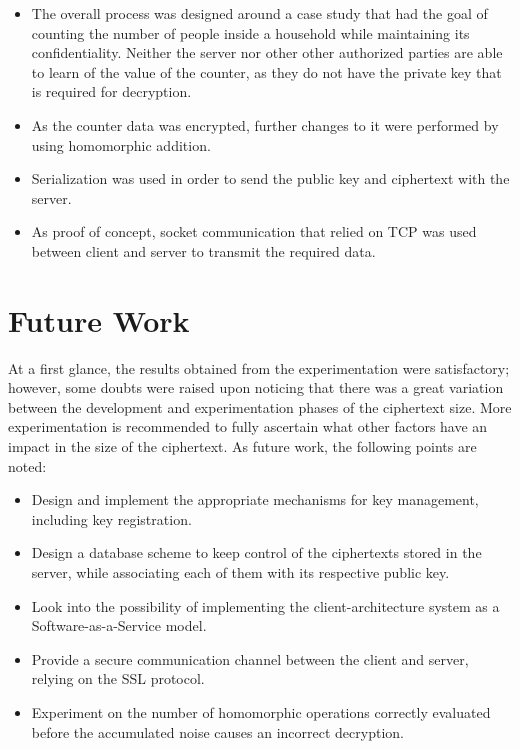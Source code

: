 \begin{itemize}
\item The overall process was designed around a case study that had the goal of counting the number of people inside a household while maintaining its confidentiality. Neither the server nor other other authorized parties are able to learn of the value of the counter, as they do not have the private key that is required for decryption.
\item As the counter data was encrypted, further changes to it were performed by using homomorphic addition. 
\item Serialization was used in order to send the public key and ciphertext with the server.
\item As proof of concept, socket communication that relied on TCP was used between client and server to transmit the required data.
\end{itemize} 

\section{Future Work}
At a first glance, the results obtained from the experimentation were satisfactory; however, some doubts were raised upon noticing that there was a great variation between the development and experimentation phases of the ciphertext size. More experimentation is recommended to fully ascertain what other factors have an impact in the size of the ciphertext. As future work, the following points are noted:

\begin{itemize}
\item Design and implement the appropriate mechanisms for key management, including key registration.
\item Design a database scheme to keep control of the ciphertexts stored in the server, while associating each of them with its respective public key.
\item Look into the possibility of implementing the client-architecture system as a Software-as-a-Service model.
\item Provide a secure communication channel between the client and server, relying on the SSL protocol.
\item Experiment on the number of homomorphic operations correctly evaluated before the accumulated noise causes an incorrect decryption.
\end{itemize}

\clearpage
